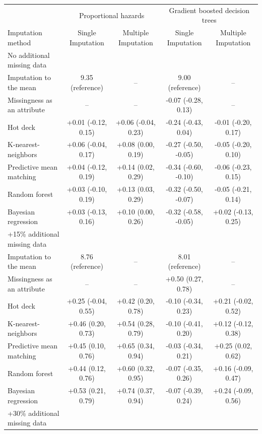 \documentclass{article}
\begin{document}
\begin{table}
\begin{tabular}{lcccc}
\toprule
& \multicolumn{2}{c}{Proportional hazards} & \multicolumn{2}{c}{Gradient boosted decision trees} \\ 
 \cmidrule(lr){2-3}\cmidrule(lr){4-5}
Imputation method & Single Imputation & Multiple Imputation & Single Imputation & Multiple Imputation \\ 
\midrule
\multicolumn{1}{l}{No additional missing data} \\ 
\midrule
Imputation to the mean & 9.35 (reference) & -- & 9.00 (reference) & -- \\ 
Missingness as an attribute & -- & -- & -0.07 (-0.28, 0.13) & -- \\ 
Hot deck & +0.01 (-0.12, 0.15) & +0.06 (-0.04, 0.23) & -0.24 (-0.43, 0.04) & -0.01 (-0.20, 0.17) \\ 
K-nearest-neighbors & +0.06 (-0.04, 0.17) & +0.08 (0.00, 0.19) & -0.27 (-0.50, -0.05) & -0.05 (-0.20, 0.10) \\ 
Predictive mean matching & +0.04 (-0.12, 0.19) & +0.14 (0.02, 0.29) & -0.34 (-0.60, -0.10) & -0.06 (-0.23, 0.15) \\ 
Random forest & +0.03 (-0.10, 0.19) & +0.13 (0.03, 0.29) & -0.32 (-0.50, -0.07) & -0.05 (-0.21, 0.14) \\ 
Bayesian regression & +0.03 (-0.13, 0.16) & +0.10 (0.00, 0.26) & -0.32 (-0.58, -0.05) & +0.02 (-0.13, 0.25) \\ 
\midrule
\multicolumn{1}{l}{+15\% additional missing data} \\ 
\midrule
Imputation to the mean & 8.76 (reference) & -- & 8.01 (reference) & -- \\ 
Missingness as an attribute & -- & -- & +0.50 (0.27, 0.78) & -- \\ 
Hot deck & +0.25 (-0.04, 0.55) & +0.42 (0.20, 0.78) & -0.10 (-0.34, 0.23) & +0.21 (-0.02, 0.52) \\ 
K-nearest-neighbors & +0.46 (0.20, 0.73) & +0.54 (0.28, 0.79) & -0.10 (-0.41, 0.20) & +0.12 (-0.12, 0.38) \\ 
Predictive mean matching & +0.45 (0.10, 0.76) & +0.65 (0.34, 0.94) & -0.03 (-0.34, 0.21) & +0.25 (0.02, 0.62) \\ 
Random forest & +0.44 (0.12, 0.76) & +0.60 (0.32, 0.95) & -0.07 (-0.35, 0.26) & +0.16 (-0.09, 0.47) \\ 
Bayesian regression & +0.53 (0.21, 0.79) & +0.74 (0.37, 0.94) & -0.07 (-0.39, 0.24) & +0.24 (-0.09, 0.56) \\ 
\midrule
\multicolumn{1}{l}{+30\% additional missing data} \\ 

\end{tabular}
\end{table}
\end{document}
